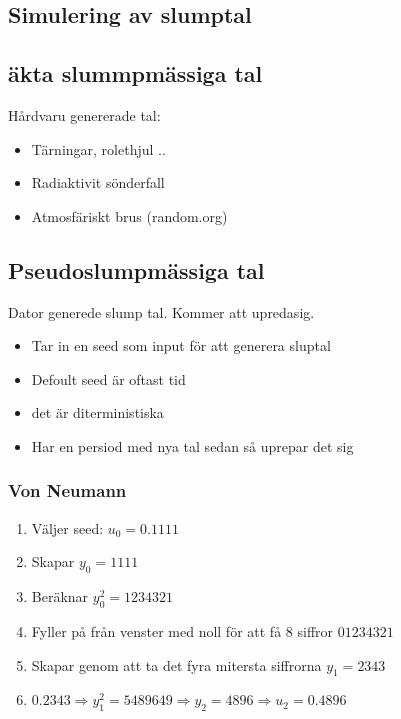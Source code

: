 \begin{multicols}{2}
\section{Simulering av slumptal}
\subsection{äkta slummpmässiga tal}
Hårdvaru genererade tal:
 \begin{itemize}
  \item Tärningar, rolethjul ..
  \item Radiaktivit sönderfall
  \item Atmosfäriskt brus (random.org)
\end{itemize}

\subsection{Pseudoslumpmässiga tal}
Dator generede slump tal. Kommer att upredasig.
\begin{itemize}
  \item Tar in en seed som input för att generera sluptal
  \item Defoult seed är oftast tid
  \item det är diterministiska
  \item Har en persiod med nya tal sedan så uprepar det sig
\end{itemize}

\subsubsection{Von Neumann}
\begin{enumerate}
  \item Väljer seed: $u_0=0.1111$ \\
  \item Skapar $y_0=1111$ \\
  \item Beräknar $y_0^2=1234321$ \\
  \item Fyller på från venster med noll för att få $8$ siffror $01234321$ \\
  \item Skapar genom att ta det fyra mitersta siffrorna $y_1=2343$ \\
  \item $0.2343 \Rightarrow y_1^2=5489649 \Rightarrow y_2=4896 \Rightarrow u_2=0.4896$ \\
\end{enumerate}


\end{multicols}

